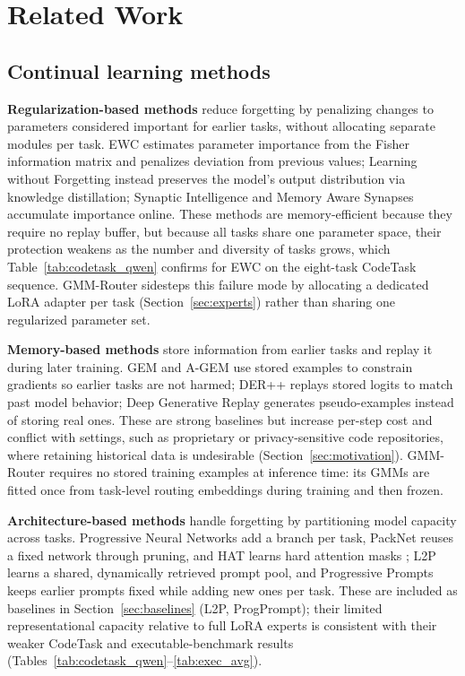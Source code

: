 \section{Related Work}
\label{sec:related_work}

\subsection{Continual learning methods}
\label{sec:rw_cl}

\textbf{Regularization-based methods} reduce forgetting by penalizing changes to parameters considered important for earlier tasks, without allocating separate modules per task. EWC \citep{kirkpatrick2017overcoming} estimates parameter importance from the Fisher information matrix and penalizes deviation from previous values; Learning without Forgetting \citep{li2017learning} instead preserves the model's output distribution via knowledge distillation; Synaptic Intelligence \citep{zenke2017continual} and Memory Aware Synapses \citep{aljundi2018memory} accumulate importance online. These methods are memory-efficient because they require no replay buffer, but because all tasks share one parameter space, their protection weakens as the number and diversity of tasks grows, which Table~\ref{tab:codetask_qwen} confirms for EWC on the eight-task CodeTask sequence. GMM-Router sidesteps this failure mode by allocating a dedicated LoRA adapter per task (Section~\ref{sec:experts}) rather than sharing one regularized parameter set.

\textbf{Memory-based methods} store information from earlier tasks and replay it during later training. GEM and A-GEM \citep{lopezpaz2017gem,chaudhry2019agem} use stored examples to constrain gradients so earlier tasks are not harmed; DER++ \citep{buzzega2020dark} replays stored logits to match past model behavior; Deep Generative Replay \citep{shin2017continual} generates pseudo-examples instead of storing real ones. These are strong baselines but increase per-step cost and conflict with settings, such as proprietary or privacy-sensitive code repositories, where retaining historical data is undesirable (Section~\ref{sec:motivation}). GMM-Router requires no stored training examples at inference time: its GMMs are fitted once from task-level routing embeddings during training and then frozen.

\textbf{Architecture-based methods} handle forgetting by partitioning model capacity across tasks. Progressive Neural Networks add a branch per task, PackNet reuses a fixed network through pruning, and HAT learns hard attention masks \citep{rusu2016progressive,mallya2018packnet,serra2018overcoming}; L2P \citep{wang2022learning} learns a shared, dynamically retrieved prompt pool, and Progressive Prompts \citep{razdaibiedina2023progressive} keeps earlier prompts fixed while adding new ones per task. These are included as baselines in Section~\ref{sec:baselines} (L2P, ProgPrompt); their limited representational capacity relative to full LoRA experts is consistent with their weaker CodeTask and executable-benchmark results (Tables~\ref{tab:codetask_qwen}--\ref{tab:exec_avg}).

